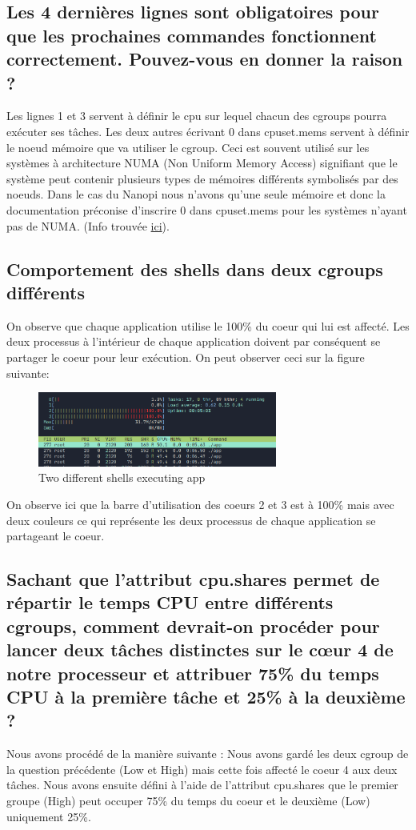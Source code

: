 \documentclass{ReportTemplate}
\begin{document}
\subsection{Les 4 dernières lignes sont obligatoires pour que les prochaines commandes fonctionnent correctement. Pouvez-vous en donner la raison ?}
Les lignes 1 et 3 servent à définir le cpu sur lequel chacun des cgroups pourra
exécuter ses tâches. Les deux autres écrivant 0 dans cpuset.mems servent à
définir le noeud mémoire que va utiliser le cgroup. Ceci est souvent utilisé sur
les systèmes à architecture NUMA (Non Uniform Memory Access) signifiant que le
système peut contenir plusieurs types de mémoires différents symbolisés par des
noeuds. Dans le cas du Nanopi nous n'avons qu'une seule mémoire et donc la
documentation préconise d'inscrire 0 dans cpuset.mems pour les systèmes n'ayant
pas de NUMA. (Info trouvée \href{https://docs.oracle.com/cd/E37670_01/E37355/html/ol_cpuset_cgroups.html#:~:text=mems%20changes.,the%20node%20list%20where%20possible.}{ici}). 
\subsection{Comportement des shells dans deux cgroups différents}
On observe que chaque application utilise le 100\% du coeur qui lui est affecté.
Les deux processus à l'intérieur de chaque application doivent par conséquent se
partager le coeur pour leur exécution. On peut observer ceci sur la figure
suivante:
\begin{figure}[H]
    \centering
    \includegraphics[width=0.7\textwidth]{imageSources/LowHigh_Groups.png}
    \caption{Two different shells executing app}
    \label{fig:LowHighGroup}
\end{figure}
On observe ici que la barre d'utilisation des coeurs 2 et 3 est à 100\% mais
avec deux couleurs ce qui représente les deux processus de chaque application se
partageant le coeur.
\subsection{Sachant que l’attribut cpu.shares permet de répartir le temps CPU entre différents cgroups, comment devrait-on procéder pour lancer deux tâches distinctes sur le cœur 4 de notre processeur et attribuer 75\% du temps CPU à la première tâche et 25\% à la deuxième ?}
Nous avons procédé de la manière suivante : \newline
Nous avons gardé les deux cgroup de la question précédente (Low et High) mais
cette fois affecté le coeur 4 aux deux tâches. Nous avons ensuite défini à
l'aide de l'attribut cpu.shares que le premier groupe (High) peut occuper 75\% du temps
du coeur et le deuxième (Low) uniquement 25\%.
\end{document}
